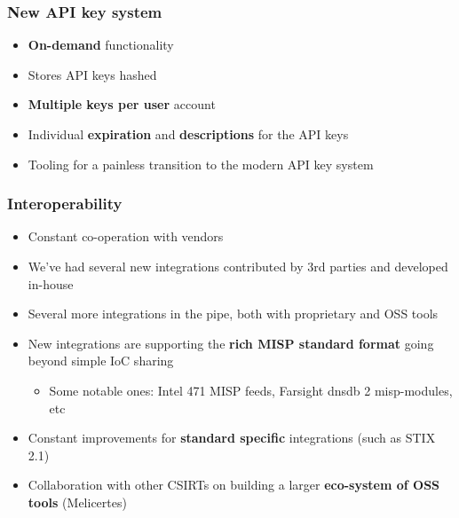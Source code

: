 \begin{frame}
\frametitle{New API key system}
\begin{itemize}
	\item {\bf On-demand} functionality
        \item Stores API keys hashed
        \item {\bf Multiple keys per user} account
        \item Individual {\bf expiration} and {\bf descriptions} for the API keys
        \item Tooling for a painless transition to the modern API key system
\end{itemize}
\noindent{}
\end{frame}

\begin{frame}
\frametitle{Interoperability}
\begin{itemize}
	\item Constant co-operation with vendors
        \item We've had several new integrations contributed by 3rd parties and developed in-house
        \item Several more integrations in the pipe, both with proprietary and OSS tools
        \item New integrations are supporting the {\bf rich MISP standard format} going beyond simple IoC sharing
        \begin{itemize}
            \item Some notable ones: Intel 471 MISP feeds, Farsight dnsdb 2 misp-modules, etc
        \end{itemize}
        \item Constant improvements for {\bf standard specific} integrations (such as STIX 2.1)
        \item Collaboration with other CSIRTs on building a larger {\bf eco-system of OSS tools} (Melicertes)
\end{itemize}
\end{frame}

